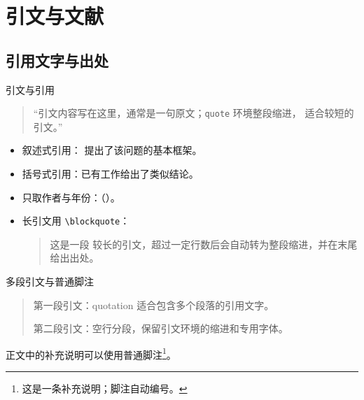 \section{引文与文献}
\subsection{引用文字与出处}
\begin{frame}{引文与引用}
  \begin{quote}
    \enquote{引文内容写在这里，通常是一句原文；\texttt{quote} 环境整段缩进，
    适合较短的引文。}
  \end{quote}

  \vspace{0.3em}
  \begin{itemize}
    \item 叙述式引用：\textcite{example2026} 提出了该问题的基本框架。
    \item 括号式引用：已有工作给出了类似结论\parencite{example2026}。
    \item 只取作者与年份：\citeauthor{example2026}（\citeyear{example2026}）。
    \item 长引文用 \texttt{\textbackslash blockquote}：\blockquote{这是一段
      较长的引文，超过一定行数后会自动转为整段缩进，并在末尾给出出处。}
  \end{itemize}
\end{frame}

\begin{frame}{多段引文与普通脚注}
  \begin{quotation}
    第一段引文：quotation 适合包含多个段落的引用文字。

    第二段引文：空行分段，保留引文环境的缩进和专用字体。
  \end{quotation}
  正文中的补充说明可以使用普通脚注\footnote{这是一条补充说明；脚注自动编号。}。
\end{frame}

